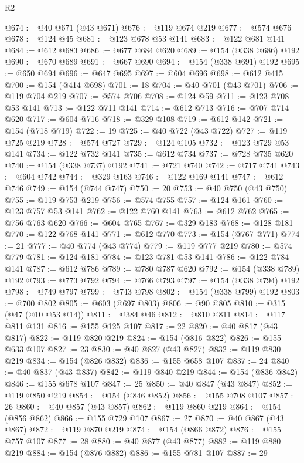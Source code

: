 \begin{lexlean}{R2}
\begin{coremodule}
{{{{{{{{{{{{{{{{{{{{{{{{{{{{{{{{{{{{{{{{{{{{{{{{{{{{{{{{{{{{{{{{{{{{{{{{{{{{{{{{{{{{{{{{{{{{@674 := @40 @671 (@43 @671)
@676 := @119 @674 @219
@677 := @574 @676
@678 := @124 @45
@681 := @123 @678 @53 @141
@683 := @122 @681 @141
@684 := @612 @683
@686 := @677 @684 @620
@689 := @154 (@338 @686) @192
@690 := @670 @689
@691 := @667 @690
@694 := @154 (@338 @691) @192
@695 := @650 @694
@696 := @647 @695
@697 := @604 @696
@698 := @612 @415
@700 := @154 (@414 @698)
@701 := 18
@704 := @40 @701 (@43 @701)
@706 := @119 @704 @219
@707 := @574 @706
@708 := @124 @59
@711 := @123 @708 @53 @141
@713 := @122 @711 @141
@714 := @612 @713
@716 := @707 @714 @620
@717 := @604 @716
@718 := @329 @108
@719 := @612 @142
@721 := @154 (@718 @719)
@722 := 19
@725 := @40 @722 (@43 @722)
@727 := @119 @725 @219
@728 := @574 @727
@729 := @124 @105
@732 := @123 @729 @53 @141
@734 := @122 @732 @141
@735 := @612 @734
@737 := @728 @735 @620
@740 := @154 (@338 @737) @192
@741 := @721 @740
@742 := @717 @741
@743 := @604 @742
@744 := @329 @163
@746 := @122 @169 @141
@747 := @612 @746
@749 := @154 (@744 @747)
@750 := 20
@753 := @40 @750 (@43 @750)
@755 := @119 @753 @219
@756 := @574 @755
@757 := @124 @161
@760 := @123 @757 @53 @141
@762 := @122 @760 @141
@763 := @612 @762
@765 := @756 @763 @620
@766 := @604 @765
@767 := @329 @183
@768 := @128 @181
@770 := @122 @768 @141
@771 := @612 @770
@773 := @154 (@767 @771)
@774 := 21
@777 := @40 @774 (@43 @774)
@779 := @119 @777 @219
@780 := @574 @779
@781 := @124 @181
@784 := @123 @781 @53 @141
@786 := @122 @784 @141
@787 := @612 @786
@789 := @780 @787 @620
@792 := @154 (@338 @789) @192
@793 := @773 @792
@794 := @766 @793
@797 := @154 (@338 @794) @192
@798 := @749 @797
@799 := @743 @798
@802 := @154 (@338 @799) @192
@803 := @700 @802
@805 := @603 (@697 @803)
@806 := @90 @805
@810 := @315 (@47 (@10 @53 @14))
@811 := @384 @46
@812 := @810 @811
@814 := @117 @811 @131
@816 := @155 @125 @107
@817 := 22
@820 := @40 @817 (@43 @817)
@822 := @119 @820 @219
@824 := @154 (@816 @822)
@826 := @155 @633 @107
@827 := 23
@830 := @40 @827 (@43 @827)
@832 := @119 @830 @219
@834 := @154 (@826 @832)
@836 := @155 @658 @107
@837 := 24
@840 := @40 @837 (@43 @837)
@842 := @119 @840 @219
@844 := @154 (@836 @842)
@846 := @155 @678 @107
@847 := 25
@850 := @40 @847 (@43 @847)
@852 := @119 @850 @219
@854 := @154 (@846 @852)
@856 := @155 @708 @107
@857 := 26
@860 := @40 @857 (@43 @857)
@862 := @119 @860 @219
@864 := @154 (@856 @862)
@866 := @155 @729 @107
@867 := 27
@870 := @40 @867 (@43 @867)
@872 := @119 @870 @219
@874 := @154 (@866 @872)
@876 := @155 @757 @107
@877 := 28
@880 := @40 @877 (@43 @877)
@882 := @119 @880 @219
@884 := @154 (@876 @882)
@886 := @155 @781 @107
@887 := 29
}}}}}}}}}}}}}}}}}}}}}}}}}}}}}}}}}}}}}}}}}}}}}}}}}}}}}}}}}}}}}}}}}}}}}}}}}}}}}}}}}}}}}}}}}}}}
\end{coremodule}
\end{lexlean}
